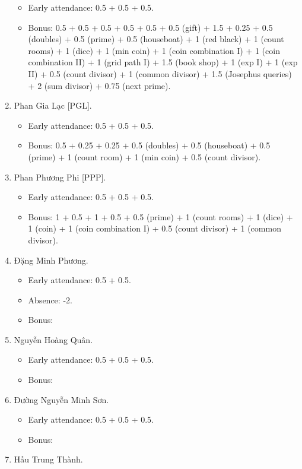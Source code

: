 \documentclass{article}
\begin{document}
\begin{enumerate}
	\begin{itemize}
		\item Early attendance: 0.5 + 0.5 + 0.5.
		\item Bonus: 0.5 + 0.5 + 0.5 + 0.5 + 0.5 + 0.5 (gift) + 1.5 + 0.25 + 0.5 (doubles) + 0.5 (prime) + 0.5 (houseboat) + 1 (red black) + 1 (count rooms) + 1 (dice) + 1 (min coin) + 1 (coin combination I) + 1 (coin combination II) + 1 (grid path I) + 1.5 (book shop) + 1 (exp I) + 1 (exp II) + 0.5 (count divisor) + 1 (common divisor) + 1.5 (Josephus queries) + 2 (sum divisor) + 0.75 (next prime).
	\end{itemize}
	\item {\sc Phan Gia Lạc [PGL].}
	\begin{itemize}
		\item Early attendance: 0.5 + 0.5 + 0.5.
		\item Bonus: 0.5 + 0.25 + 0.25 + 0.5 (doubles) + 0.5 (houseboat) + 0.5 (prime) + 1 (count room) + 1 (min coin) + 0.5 (count divisor).
	\end{itemize}
	\item {\sc Phan Phương Phi [PPP].}
	\begin{itemize}
		\item Early attendance: 0.5 + 0.5 + 0.5.
		\item Bonus: 1 + 0.5 + 1 + 0.5 + 0.5 (prime) + 1 (count rooms) + 1 (dice) + 1 (coin) + 1 (coin combination I) + 0.5 (count divisor) + 1 (common divisor).
	\end{itemize}
	\item {\sc Đặng Minh Phương.}
	\begin{itemize}
		\item Early attendance: 0.5 + 0.5.
		\item Absence: -2.
		\item Bonus: 
	\end{itemize}
	\item {\sc Nguyễn Hoàng Quân.}
	\begin{itemize}
		\item Early attendance: 0.5 + 0.5 + 0.5.
		\item Bonus: 
	\end{itemize}
	\item {\sc Đường Nguyễn Minh Sơn.}
	\begin{itemize}
		\item Early attendance: 0.5 + 0.5 + 0.5.
		\item Bonus: 
	\end{itemize}
	\item {\sc Hấu Trung Thành.}

\end{enumerate}
\end{document}

